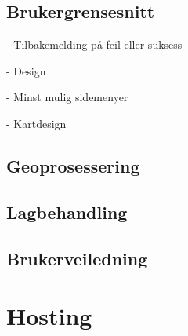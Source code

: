 \subsection{Brukergrensesnitt}

- Tilbakemelding på feil eller suksess

- Design

- Minst mulig sidemenyer

- Kartdesign

\subsection{Geoprosessering}

\subsection{Lagbehandling}

\subsection{Brukerveiledning}

\section{Hosting}
\label{sec:hosting}
